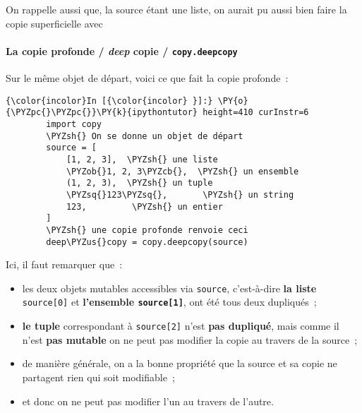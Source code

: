    On rappelle aussi que, la source étant une liste, on aurait pu aussi
bien faire la copie superficielle avec

\begin{Shaded}
\begin{Highlighting}[]
\OperatorTok{=}
\end{Highlighting}
\end{Shaded}

    \hypertarget{la-copie-profonde-deep-copie-copy.deepcopy}{%
\paragraph{\texorpdfstring{La copie profonde / \emph{deep} copie /
\texttt{copy.deepcopy}}{La copie profonde / deep copie / copy.deepcopy}}\label{la-copie-profonde-deep-copie-copy.deepcopy}}

    Sur le même objet de départ, voici ce que fait la copie profonde~:

    \begin{Verbatim}[commandchars=\\\{\}]
{\color{incolor}In [{\color{incolor} }]:} \PY{o}{\PYZpc{}\PYZpc{}}\PY{k}{ipythontutor} height=410 curInstr=6
        import copy
        \PYZsh{} On se donne un objet de départ
        source = [
            [1, 2, 3],  \PYZsh{} une liste
            \PYZob{}1, 2, 3\PYZcb{},  \PYZsh{} un ensemble
            (1, 2, 3),  \PYZsh{} un tuple
            \PYZsq{}123\PYZsq{},       \PYZsh{} un string
            123,         \PYZsh{} un entier
        ]
        \PYZsh{} une copie profonde renvoie ceci
        deep\PYZus{}copy = copy.deepcopy(source)
\end{Verbatim}


    Ici, il faut remarquer que~:
    
\begin{itemize}
	\item 
	les deux objets mutables accessibles via
	\texttt{source}, c'est-à-dire \textbf{la liste} \texttt{source{[}0{]}}
	et \textbf{l'ensemble \texttt{source{[}1{]}}}, ont été tous deux dupliqués~;
	\item
	\textbf{le tuple} correspondant à \texttt{source{[}2{]}}
	n'est \textbf{pas dupliqué}, mais comme il n'est \textbf{pas mutable} on
	ne peut pas modifier la copie au travers de la source~;
	\item
	de manière générale, on a la bonne propriété que la source et sa copie ne partagent
	rien qui soit modifiable~;
	\item
	et donc on ne peut pas modifier l'un au
	travers de l'autre.
\end{itemize}

